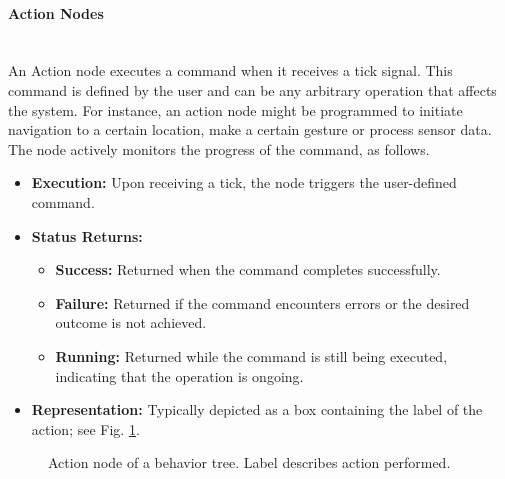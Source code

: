 \documentclass{CSSRforAfrica}
\begin{document}
 

\paragraph{Action Nodes}~\\
An Action node executes a command when it receives a tick signal. This command is defined by the user and can be any arbitrary operation that affects the system. For instance, an action node might be programmed to initiate navigation to a certain location, make a certain gesture or process sensor data. The node actively monitors the progress of the command, as follows.
\newpage

\begin{itemize}
    \item \textbf{Execution:} Upon receiving a tick, the node triggers the user-defined command.
    \item \textbf{Status Returns:}
    \begin{itemize}
        \item \textbf{Success:} Returned when the command completes successfully.
        \item \textbf{Failure:} Returned if the command encounters errors or the desired outcome is not achieved.
        \item \textbf{Running:} Returned while the command is still being executed, indicating that the operation is ongoing.
    \end{itemize}
    \item \textbf{Representation:} Typically depicted as a box containing the label of the action; see Fig. \ref{fig:action}.
\end{itemize}


    \begin{figure}[h]
        \centering
        \caption{Action node of a behavior tree. Label describes action performed.}
        \label{fig:action}
    \end{figure}
\end{document}
